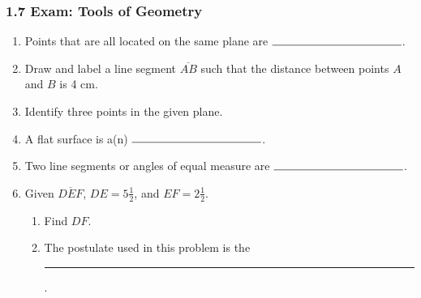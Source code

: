 \documentclass[12pt, twoside]{article}
\begin{document}
  \subsubsection*{1.7 Exam: Tools of Geometry}
    \vspace{0.5cm}
    \begin{enumerate}
      \item Points that are all located on the same plane are $\rule{4cm}{0.15mm}$.\bigskip


      \item Draw and label a line segment $\overline{AB}$ such that the distance between points $A$ and $B$ is 4 cm. \vspace{2cm}


      \item Identify three points in the given plane.\\[0.25in]
         \vspace{1cm}


      \item A flat surface is a(n) $\rule{4cm}{0.15mm}$. \bigskip

      \item Two line segments or angles of equal measure are $\rule{4cm}{0.15mm}$.
        \bigskip

      \item Given $\overline{DEF}$, $DE=5 \frac{1}{2}$, and $EF=2 \frac{1}{2}$.
      \begin{enumerate}
        \item Find ${DF}$.\\[.5in]
           \bigskip
        \item The postulate used in this problem is the \rule{6cm}{0.15mm}.
      \end{enumerate}


\end{enumerate}
\end{document}

